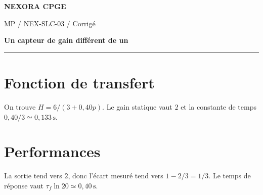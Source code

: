 \documentclass[11pt,a4paper]{article}
\begin{document}
{\small\bfseries\color{nexorablue} NEXORA CPGE}\par
{\small MP / NEX-SLC-03 / Corrigé}\par
{\LARGE\bfseries Un capteur de gain différent de un}\par
\vspace{0.25em}\hrule\vspace{0.6em}

\section*{Fonction de transfert}
On trouve $H=6/(3+0{,}40p)$. Le gain statique vaut $2$ et la constante de temps $0{,}40/3\simeq0{,}133\,\mathrm s$.

\section*{Performances}
La sortie tend vers $2$, donc l’écart mesuré tend vers $1-2/3=1/3$. Le temps de réponse vaut $\tau_f\ln20\simeq0{,}40\,\mathrm s$.
\end{document}
